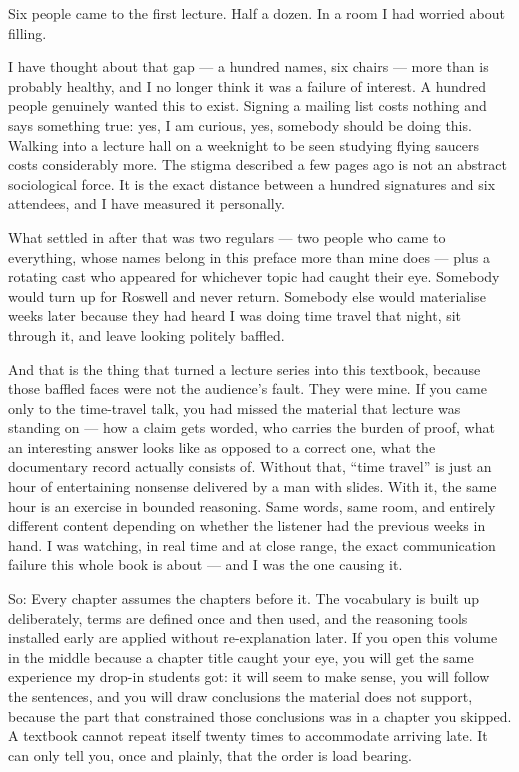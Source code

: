 Six people came to the first lecture. Half a dozen. In a room I had worried
about filling.

I have thought about that gap --- a hundred names, six chairs --- more than is
probably healthy, and I no longer think it was a failure of interest. A hundred
people genuinely wanted this to exist. Signing a mailing list costs nothing and
says something true: yes, I am curious, yes, somebody should be doing this.
Walking into a lecture hall on a weeknight to be seen studying flying saucers
costs considerably more. The stigma described a few pages ago is not an abstract
sociological force. It is the exact distance between a hundred signatures and
six attendees, and I have measured it personally.

What settled in after that was two regulars --- two people who came to
everything, whose names belong in this preface more than mine does --- plus a
rotating cast who appeared for whichever topic had caught their eye. Somebody
would turn up for Roswell and never return. Somebody else would materialise
weeks later because they had heard I was doing time travel that night, sit
through it, and leave looking politely baffled.

And that is the thing that turned a lecture series into this textbook, because
those baffled faces were not the audience's fault. They were mine. If you came
only to the time-travel talk, you had missed the material that lecture was
standing on --- how a claim gets worded, who carries the burden of proof, what
an interesting answer looks like as opposed to a correct one, what the
documentary record actually consists of. Without that, ``time travel'' is just
an hour of entertaining nonsense delivered by a man with slides. With it, the
same hour is an exercise in bounded reasoning. Same words, same room, and
entirely different content depending on whether the listener had the previous
weeks in hand. I was watching, in real time and at close range, the exact
communication failure this whole book is about --- and I was the one causing it.

So:  Every chapter assumes the chapters before it. The vocabulary is
built up deliberately, terms are defined once and then used, and the reasoning
tools installed early are applied without re-explanation later. If you open this
volume in the middle because a chapter title caught your eye, you will get the
same experience my drop-in students got: it will seem to make sense, you will
follow the sentences, and you will draw conclusions the material does not
support, because the part that constrained those conclusions was in a chapter
you skipped. A textbook cannot repeat itself twenty times to accommodate
arriving late. It can only tell you, once and plainly, that the order is load
bearing.


